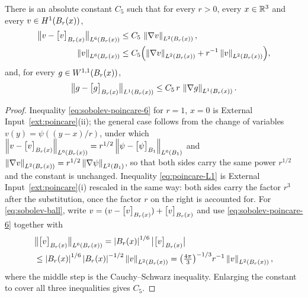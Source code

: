 \documentclass[11pt,reqno]{amsart}
\begin{document}
\begin{lemma}\label{lem:sobolev-poincare-ball}
There is an absolute constant $C_{5}$ such that for every $r>0$, every
$x\in\mathbb{R}^{3}$ and every $v\in H^{1}(B_{r}(x))$,
\begin{align}
  \bigl\|v-\bigl[v\bigr]_{B_{r}(x)}\bigr\|_{L^{6}(B_{r}(x))}
    &\le C_{5}\,\left\lVert \nabla v \right\rVert_{L^{2}(B_{r}(x))},
    \label{eq:sobolev-poincare-6}\\
  \left\lVert v \right\rVert_{L^{6}(B_{r}(x))}
    &\le C_{5}\Bigl(\left\lVert \nabla v \right\rVert_{L^{2}(B_{r}(x))}
       +r^{-1}\left\lVert v \right\rVert_{L^{2}(B_{r}(x))}\Bigr),
    \label{eq:sobolev-ball}
\end{align}
and, for every $g\in W^{1,1}(B_{r}(x))$,
\begin{equation}\label{eq:poincare-L1}
  \bigl\|g-\bigl[g\bigr]_{B_{r}(x)}\bigr\|_{L^{1}(B_{r}(x))}
  \le C_{5}\,r\,\left\lVert \nabla g \right\rVert_{L^{1}(B_{r}(x))} .
\end{equation}
\end{lemma}

\begin{proof}
Inequality \eqref{eq:sobolev-poincare-6} for $r=1$, $x=0$ is
External Input~\ref{ext:poincare}(ii); the general case follows from the change
of variables $v(y)=\psi((y-x)/r)$, under which
$\left\lVert v-\bigl[v\bigr]_{B_{r}(x)} \right\rVert_{L^{6}(B_{r}(x))}
 =r^{1/2}\left\lVert \psi-\bigl[\psi\bigr]_{B_{1}} \right\rVert_{L^{6}(B_{1})}$ and
$\left\lVert \nabla v \right\rVert_{L^{2}(B_{r}(x))}=r^{1/2}\left\lVert \nabla\psi \right\rVert_{L^{2}(B_{1})}$,
so that both sides carry the same power $r^{1/2}$ and the constant is unchanged.
Inequality \eqref{eq:poincare-L1} is External Input~\ref{ext:poincare}(i)
rescaled in the same way: both sides carry the factor $r^{3}$ after the
substitution, once the factor $r$ on the right is accounted for. For
\eqref{eq:sobolev-ball}, write $v=(v-\bigl[v\bigr]_{B_{r}(x)})+\bigl[v\bigr]_{B_{r}(x)}$
and use \eqref{eq:sobolev-poincare-6} together with
\[\begin{aligned}
  &\bigl\|\bigl[v\bigr]_{B_{r}(x)}\bigr\|_{L^{6}(B_{r}(x))}
  =\left\lvert B_{r}(x) \right\rvert^{1/6}\bigl|\bigl[v\bigr]_{B_{r}(x)}\bigr|
  \\ &\le\left\lvert B_{r}(x) \right\rvert^{1/6}\left\lvert B_{r}(x) \right\rvert^{-1/2}\left\lVert v \right\rVert_{L^{2}(B_{r}(x))}
  =\bigl(\tfrac{4\pi}{3}\bigr)^{-1/3}r^{-1}\left\lVert v \right\rVert_{L^{2}(B_{r}(x))},
\end{aligned}\]
where the middle step is the Cauchy--Schwarz inequality. Enlarging the constant
to cover all three inequalities gives $C_{5}$.
\end{proof}
\end{document}
